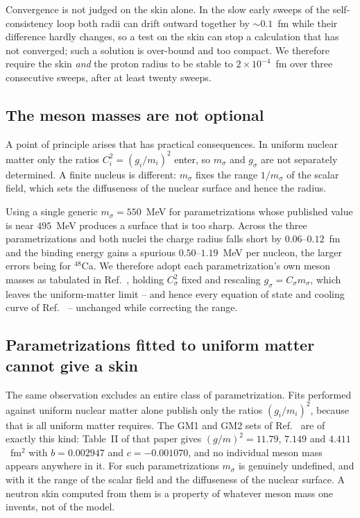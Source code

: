 \documentclass[aps,prc,twocolumn,showpacs,superscriptaddress,floatfix]{revtex4-2}
\begin{document}
Convergence is not judged on the skin alone. In the slow early sweeps of the
self-consistency loop both radii can drift outward together by $\sim0.1$~fm
while their difference hardly changes, so a test on the skin can stop a
calculation that has not converged; such a solution is over-bound and too
compact. We therefore require the skin \emph{and} the proton radius to be
stable to $2\times10^{-4}$~fm over three consecutive sweeps, after at least
twenty sweeps.

\subsection{The meson masses are not optional}
\label{sec:msigma}

A point of principle arises that has practical consequences. In uniform nuclear
matter only the ratios $C_i^2=(g_i/m_i)^2$ enter, so $m_\sigma$ and $g_\sigma$
are not separately determined. A finite nucleus is different: $m_\sigma$ fixes
the range $1/m_\sigma$ of the scalar field, which sets the diffuseness of the
nuclear surface and hence the radius.

Using a single generic $m_\sigma = 550$~MeV for parametrizations whose
published value is near $495$~MeV produces a surface that is too sharp. Across
the three parametrizations and both nuclei the charge radius falls short by
$0.06$--$0.12$~fm and the binding energy gains a spurious
$0.50$--$1.19$~MeV per nucleon, the larger errors being for $^{48}$Ca. We therefore adopt each parametrization's own meson masses as
tabulated in Ref.~\cite{Das2021}, holding
$C_\sigma^2$ fixed and rescaling $g_\sigma = C_\sigma m_\sigma$, which leaves
the uniform-matter limit -- and hence every equation of state and cooling
curve of Ref.~\cite{PaperI} -- unchanged while correcting the range.

\subsection{Parametrizations fitted to uniform matter cannot give a skin}
\label{sec:gm}

The same observation excludes an entire class of parametrization. Fits
performed against uniform nuclear matter alone publish only the ratios
$(g_i/m_i)^2$, because that is all uniform matter requires. The GM1 and GM2
sets of Ref.~\cite{GM1991} are of exactly this kind: Table~II of that paper
gives $(g/m)^2 = 11.79$, $7.149$ and $4.411$~fm$^2$ with $b=0.002947$ and
$c=-0.001070$, and no individual meson mass appears anywhere in it. For such
parametrizations $m_\sigma$ is genuinely undefined, and with it the range of the
scalar field and the diffuseness of the nuclear surface. A neutron skin
computed from them is a property of whatever meson mass one invents, not of the
model.
\end{document}
